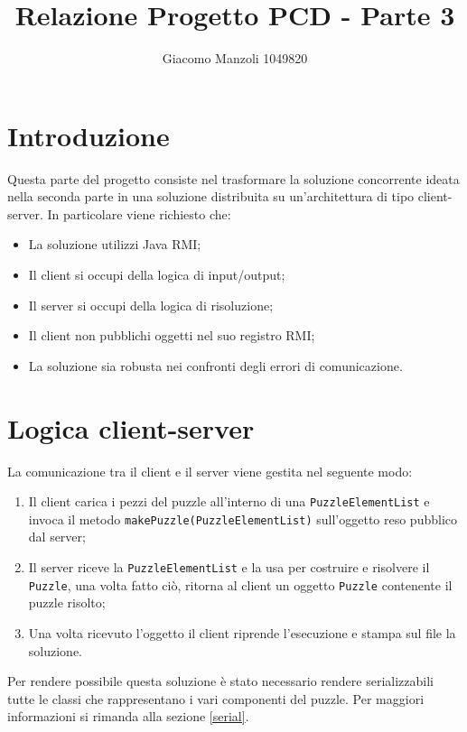 \documentclass[a4paper, 12pt]{article}
\begin{document}
\title{Relazione Progetto PCD - Parte 3}
\author{Giacomo Manzoli 1049820}
\maketitle

\tableofcontents

\pagebreak

\section{Introduzione}
Questa parte del progetto consiste nel trasformare la soluzione concorrente ideata nella seconda parte in una soluzione distribuita su un'architettura di tipo client-server.
In particolare viene richiesto che:
\begin{itemize}
\item La soluzione utilizzi Java RMI;
\item Il client si occupi della logica di input/output;
\item Il server si occupi della logica di risoluzione;
\item Il client non pubblichi oggetti nel suo registro RMI;
\item La soluzione sia robusta nei confronti degli errori di comunicazione.
\end{itemize}

\section{Logica client-server}
La comunicazione tra il client e il server viene gestita nel seguente modo:
\begin{enumerate}
\item Il client carica i pezzi del puzzle all'interno di una \texttt{PuzzleElementList} e invoca il metodo \texttt{makePuzzle(PuzzleElementList)} sull'oggetto reso pubblico dal server;
\item Il server riceve la \texttt{PuzzleElementList} e la usa per costruire e risolvere il \texttt{Puzzle}, una volta fatto ciò, ritorna al client un oggetto \texttt{Puzzle} contenente il puzzle risolto;
\item Una volta ricevuto l'oggetto il client riprende l'esecuzione e stampa sul file la soluzione.
\end{enumerate}
Per rendere possibile questa soluzione è stato necessario rendere serializzabili tutte le classi che rappresentano i vari componenti del puzzle. Per maggiori informazioni si rimanda alla sezione \ref{serial}.
\end{document}
